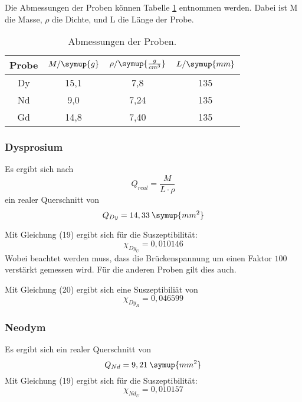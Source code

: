 Die Abmessungen der Proben können Tabelle \ref{tab:Dy} entnommen werden.
Dabei ist M die Masse, $\rho$ die Dichte, und L die Länge der Probe.

\begin{table}[H]
  \centering
  \caption{Abmessungen der Proben.}
  \label{tab:Dy}
  \begin{tabular}{c c c c}
    \toprule
    Probe & $M/ \symup{g}$ & $\rho / \symup{\frac{g}{cm^3}}$   & $L / \symup{mm}$  \\
    \midrule
    Dy & 15,1 & 7,8 & 135\\
    Nd & 9,0 & 7,24 & 135\\
    Gd & 14,8 & 7,40 & 135\\
    \bottomrule
  \end{tabular}
\end{table}



\subsubsection{Dysprosium}
Es ergibt sich nach
\begin{equation*}
  Q_{real} = \frac{M}{L \cdot \rho}
\end{equation*}
ein realer Querschnitt von
\begin{equation*}
  Q_{Dy} = 14,33 \: \symup{mm^2}
\end{equation*}

Mit Gleichung (19) ergibt sich für die Suszeptibilität:
\begin{equation*}
  \chi_{Dy_U} = 0,010146
\end{equation*}
Wobei beachtet werden muss, dass die Brückenspannung um einen Faktor $100$ verstärkt gemessen wird. Für die anderen
Proben gilt dies auch.

Mit Gleichung (20) ergibt sich eine Suszeptibiliät von
\begin{equation*}
  \chi_{Dy_R} = 0,046599
\end{equation*}

\subsubsection{Neodym}
Es ergibt sich ein realer Querschnitt von
\begin{equation*}
  Q_{Nd} = 9,21 \: \symup{mm^2}
\end{equation*}
Mit Gleichung (19) ergibt sich für die Suszeptibilität:
\begin{equation*}
  \chi_{Nd_U} = 0,010157
\end{equation*}

